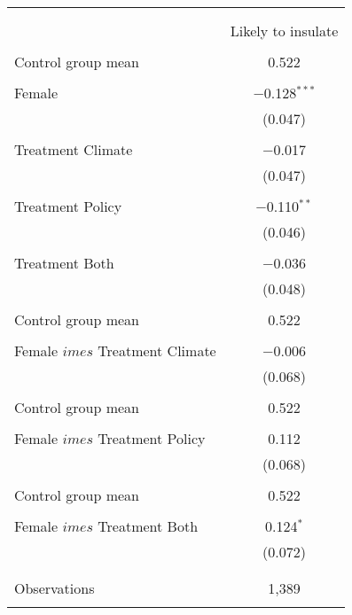 
\begin{tabular}{@{\extracolsep{5pt}}lc} 
\\[-1.8ex]\hline 
\hline \\[-1.8ex] 
\\[-1.8ex] & Likely to insulate \\ 
\hline \\[-1.8ex] 
 Control group mean & 0.522  \\ \hline \\[-1.8ex] Female & $-$0.128$^{***}$ \\ 
  & (0.047) \\ 
  & \\ 
 Treatment Climate & $-$0.017 \\ 
  & (0.047) \\ 
  & \\ 
 Treatment Policy & $-$0.110$^{**}$ \\ 
  & (0.046) \\ 
  & \\ 
 Treatment Both & $-$0.036 \\ 
  & (0.048) \\ 
  & \\ 
 Control group mean & 0.522  \\ \hline \\[-1.8ex] Female $	imes$ Treatment Climate & $-$0.006 \\ 
  & (0.068) \\ 
  & \\ 
 Control group mean & 0.522  \\ \hline \\[-1.8ex] Female $	imes$ Treatment Policy & 0.112 \\ 
  & (0.068) \\ 
  & \\ 
 Control group mean & 0.522  \\ \hline \\[-1.8ex] Female $	imes$ Treatment Both & 0.124$^{*}$ \\ 
  & (0.072) \\ 
  & \\ 
\hline \\[-1.8ex] 

Observations & 1,389 \\ 
\hline 
\hline \\[-1.8ex] 
\end{tabular} 